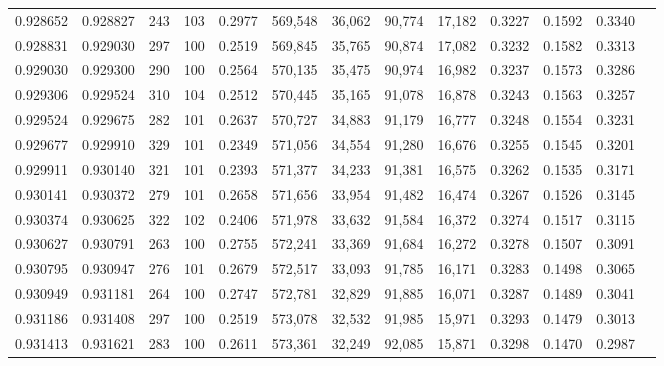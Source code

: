 \begin{tabular}{rrrrrrrrrrrrr}
0.928652 & 0.928827 &   243 & 103 &                                     0.2977 & 569,548 &  36,062 &  90,774 &  17,182 & 0.3227 & 0.1592 & 0.3340 \\
0.928831 & 0.929030 &   297 & 100 &                                     0.2519 & 569,845 &  35,765 &  90,874 &  17,082 & 0.3232 & 0.1582 & 0.3313 \\
0.929030 & 0.929300 &   290 & 100 &                                     0.2564 & 570,135 &  35,475 &  90,974 &  16,982 & 0.3237 & 0.1573 & 0.3286 \\
0.929306 & 0.929524 &   310 & 104 &                                     0.2512 & 570,445 &  35,165 &  91,078 &  16,878 & 0.3243 & 0.1563 & 0.3257 \\
0.929524 & 0.929675 &   282 & 101 &                                     0.2637 & 570,727 &  34,883 &  91,179 &  16,777 & 0.3248 & 0.1554 & 0.3231 \\
0.929677 & 0.929910 &   329 & 101 &                                     0.2349 & 571,056 &  34,554 &  91,280 &  16,676 & 0.3255 & 0.1545 & 0.3201 \\
0.929911 & 0.930140 &   321 & 101 &                                     0.2393 & 571,377 &  34,233 &  91,381 &  16,575 & 0.3262 & 0.1535 & 0.3171 \\
0.930141 & 0.930372 &   279 & 101 &                                     0.2658 & 571,656 &  33,954 &  91,482 &  16,474 & 0.3267 & 0.1526 & 0.3145 \\
0.930374 & 0.930625 &   322 & 102 &                                     0.2406 & 571,978 &  33,632 &  91,584 &  16,372 & 0.3274 & 0.1517 & 0.3115 \\
0.930627 & 0.930791 &   263 & 100 &                                     0.2755 & 572,241 &  33,369 &  91,684 &  16,272 & 0.3278 & 0.1507 & 0.3091 \\
0.930795 & 0.930947 &   276 & 101 &                                     0.2679 & 572,517 &  33,093 &  91,785 &  16,171 & 0.3283 & 0.1498 & 0.3065 \\
0.930949 & 0.931181 &   264 & 100 &                                     0.2747 & 572,781 &  32,829 &  91,885 &  16,071 & 0.3287 & 0.1489 & 0.3041 \\
0.931186 & 0.931408 &   297 & 100 &                                     0.2519 & 573,078 &  32,532 &  91,985 &  15,971 & 0.3293 & 0.1479 & 0.3013 \\
0.931413 & 0.931621 &   283 & 100 &                                     0.2611 & 573,361 &  32,249 &  92,085 &  15,871 & 0.3298 & 0.1470 & 0.2987 \\

\end{tabular}
